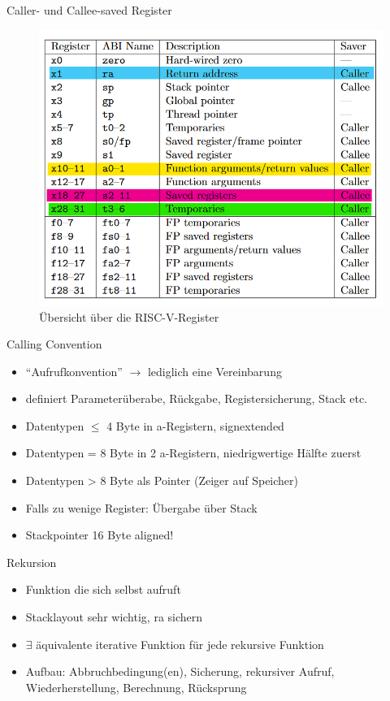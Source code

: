 \documentclass[
  german,            %
  aspectratio=169,    %
]{tumbeamer}
\begin{document}
\begin{frame}[c]{Caller- und Callee-saved Register}{}
  \begin{figure}[h]
  \includegraphics[height=0.75\textheight]{resources/w03_calling_conv_regs.png}
  \caption{Übersicht über die RISC-V-Register}
  \end{figure}
\end{frame}

\begin{frame}[c]{Calling Convention}{}
  \begin{itemize}
    \item \enquote{Aufrufkonvention} $\rightarrow$ lediglich eine Vereinbarung
    \item definiert Parameterüberabe, Rückgabe, Registersicherung, Stack etc.
    \item Datentypen $\le$ 4 Byte in a-Registern, signextended
    \item Datentypen = 8 Byte in 2 a-Registern, niedrigwertige Hälfte zuerst
    \item Datentypen > 8 Byte als Pointer (Zeiger auf Speicher)
    \item Falls zu wenige Register: Übergabe über Stack
    \item Stackpointer 16 Byte aligned!
  \end{itemize}
\end{frame}

\begin{frame}[fragile, c]{Rekursion}{}
  \begin{itemize}
    \item Funktion die sich selbst aufruft
    \item Stacklayout sehr wichtig, ra sichern
    \item $\exists$ äquivalente iterative Funktion für jede rekursive Funktion
    \item Aufbau: Abbruchbedingung(en), Sicherung, rekursiver Aufruf, Wiederherstellung, Berechnung, Rücksprung
  \end{itemize}  
\end{frame}
\end{document}
